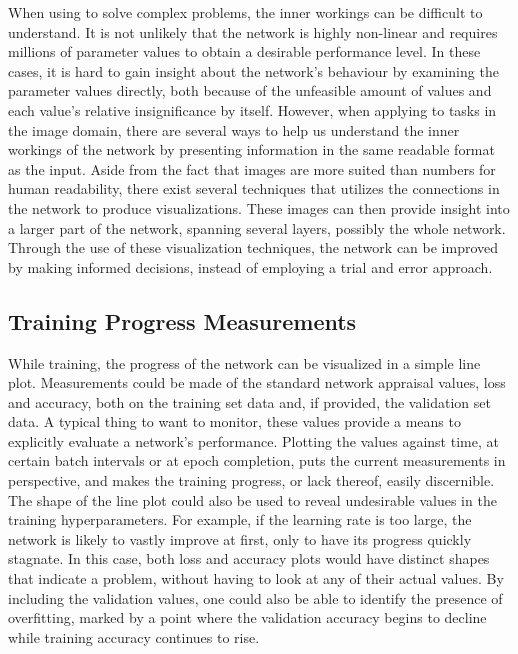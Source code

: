 When using  to solve complex problems, the inner workings can be difficult to understand. It is not unlikely that the network is highly non-linear and requires millions of parameter values to obtain a desirable performance level. In these cases, it is hard to gain insight about the network's behaviour by examining the parameter values directly, both because of the unfeasible amount of values and each value's relative insignificance by itself. However, when applying  to tasks in the image domain, there are several ways to help us understand the inner workings of the network by presenting information in the same readable format as the input. Aside from the fact that images are more suited than numbers for human readability, there exist several techniques that utilizes the connections in the network to produce visualizations. These images can then provide insight into a larger part of the network, spanning several layers, possibly the whole network. Through the use of these visualization techniques, the network can be improved by making informed decisions, instead of employing a trial and error approach. 

\subsection{Training Progress Measurements}

While training, the progress of the network can be visualized in a simple line plot. Measurements could be made of the standard network appraisal values, loss and accuracy, both on the training set data and, if provided, the validation set data. A typical thing to want to monitor, these values provide a means to explicitly evaluate a network's performance. Plotting the values against time, at certain batch intervals or at epoch completion, puts the current measurements in perspective, and makes the training progress, or lack thereof, easily discernible. The shape of the line plot could also be used to reveal undesirable values in the training hyperparameters. For example, if the learning rate is too large, the network is likely to vastly improve at first, only to have its progress quickly stagnate. In this case, both loss and accuracy plots would have distinct shapes that indicate a problem, without having to look at any of their actual values. By including the validation values, one could also be able to identify the presence of overfitting, marked by a point where the validation accuracy begins to decline while training accuracy continues to rise.

